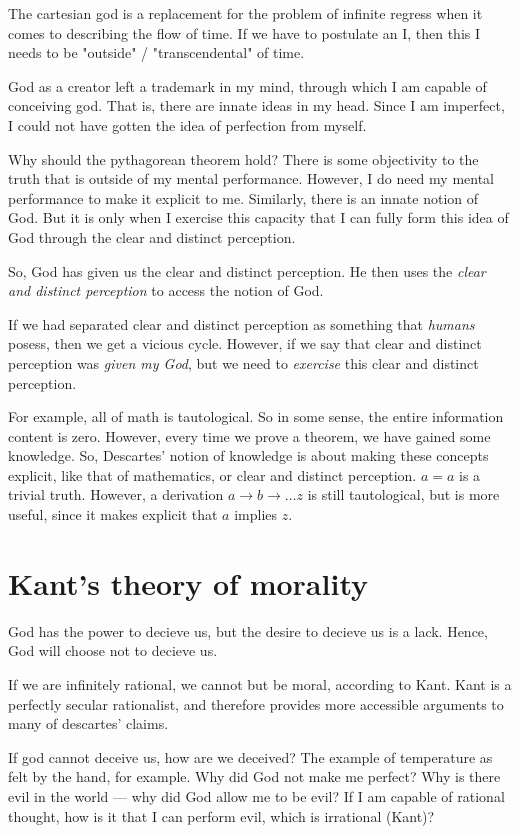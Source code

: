 \documentclass[11pt]{book}
\begin{document}
The cartesian god is a replacement for the problem of infinite regress when
it comes to describing the flow of time. If we have to postulate an I, then
this I needs to be "outside" / "transcendental" of time.


God as a creator left a trademark in my mind, through which I am capable of
conceiving god.  That is, there are innate ideas in my head. Since I am
imperfect, I could not have gotten the idea of perfection from myself.


Why should the pythagorean theorem hold? There is some objectivity to the truth
that is outside of my mental performance. However, I do need my mental
performance to make it explicit to me. Similarly, there is an innate notion of
God. But it is only when I exercise this capacity that I can fully form this
idea of God through the clear and distinct perception.

So, God has given us the clear and distinct perception. He then uses
the \emph{clear and distinct perception} to access the notion of God.


If we had separated clear and distinct perception as something that \emph{humans}
posess, then we get a vicious cycle. However, if we say that clear and
distinct perception was \emph{given my God}, but we need to \emph{exercise} this
clear and distinct perception.


For example, all of math is tautological. So in some sense, the entire
information content is zero. However, every time we prove a theorem, we have
gained some knowledge. So, Descartes' notion of knowledge is about making
these concepts explicit, like that of mathematics, or clear and distinct
perception. ${a = a}$ is a trivial truth. However, a derivation 
${a \rightarrow b \rightarrow \dots z}$
is still tautological, but is more useful, since it makes explicit that $a$
implies $z$.

\section{Kant's theory of morality}

God has the power to decieve us, but the desire to decieve us is a lack. 
Hence, God will choose not to decieve us.

If we are infinitely rational, we cannot but be moral, according to Kant.
Kant is a perfectly secular rationalist, and therefore provides more
accessible arguments to many of descartes' claims. 

If god cannot deceive us, how are we deceived? The example of 
temperature as felt by the hand, for example. Why did God not
make me perfect? Why is there evil in the world --- why did God
allow me to be evil? If I am capable of rational thought, how is it
that I can perform evil, which is irrational (Kant)?
\end{document}
